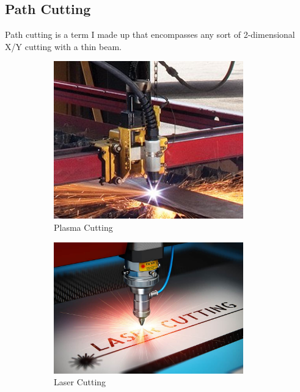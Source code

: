 \documentclass[10pt,letterpaper]{book}
\begin{document}
 \subsection{Path Cutting}
 
 Path cutting is a term I made up that encompasses any sort of 2-dimensional X/Y cutting with a thin beam.
 
 \begin{figure}[H]
		\centering
		\begin{subfigure}[b]{.24\linewidth}
			\includegraphics[width=0.9\textwidth]{imgs/plasmacut.jpeg}
			\caption{Plasma Cutting}
		\end{subfigure}\begin{subfigure}[b]{.24\linewidth}
			\includegraphics[width=0.9\textwidth]{imgs/lasercut.jpeg}
			\caption{Laser Cutting}
		\end{subfigure}\begin{subfigure}[b]{.24\linewidth}

\end{subfigure}
\end{figure}
\end{document}
